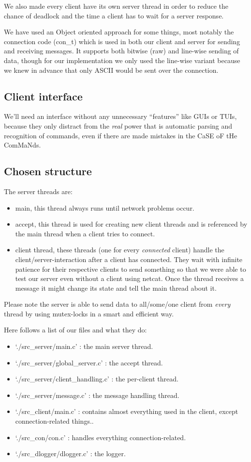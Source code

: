 \documentclass[a4paper]{article}
\begin{document}
We also made every client have its own server thread in order to reduce the
chance of deadlock and the time a client has to wait for a server response.

We have used an Object oriented approach for some things, most notably the
connection code (con\_t) which is used in both our client and server for sending
and receiving messages. It supports both bitwise (raw) and
line-wise sending of data, though for our implementation we only used the
line-wise variant because we knew in advance that only ASCII would be sent over
the connection.
\subsection{Client interface}
We'll need an interface without any unnecessary ``features'' like GUIs or TUIs,
because they only distract from the \emph{real} power that is automatic parsing
and recognition of commands, even if there are made mistakes in the CaSE oF tHe
ComMaNds.

\subsection{Chosen structure}
The server threads are:
\begin{itemize}
\item main, this thread always runs until network problems occur.
\item accept, this thread is used for creating new client threads and is
referenced by the main thread when a client tries to connect.
\item client thread, these threads (one for every \emph{connected} client)
handle the client/server-interaction after a client has connected. They wait
with infinite patience for their respective clients to send something so that
we were able to test our server even without a client using netcat. Once the
thread receives a message it might change its state and tell the main thread
about it.
\end{itemize}

Please note the server is able to send data to all/some/one client from
\emph{every} thread by using mutex-locks in a smart and efficient way.

Here follows a list of our files and what they do:
\begin{itemize}
\item `./src_server/main.c' : the main server thread.
\item `./src_server/global_server.c' : the accept thread.
\item `./src_server/client_handling.c' : the per-client thread.
\item `./src_server/message.c' : the message handling thread.

\item `./src_client/main.c' : contains almost everything used in the client,
except connection-related things..

\item `./src_con/con.c' : handles everything connection-related.

\item `./src_dlogger/dlogger.c' : the logger.
\end{itemize}
\end{document}

